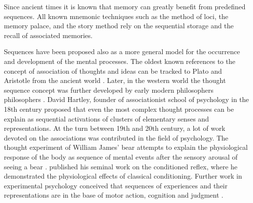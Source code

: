 
  Since ancient times it is known that memory can greatly benefit from
  predefined sequences. All known mnemonic techniques such as the method of
  loci, the memory palace, and the story method rely on the sequential storage
  and the recall of associated memories.

  Sequences have been proposed also as a more general model for the occurrence
  and development of the mental processes. The oldest known references to the
  concept of association of thoughts and ideas can be tracked to Plato and
  Aristotle from the ancient world \citep{Plato:Phaedo, Bloch2007}. Later, in the western world the thought
  sequence concept was further developed by early modern philosophers
  philosophers \citep{Hobbes, Locke, Hume, Hume2, Stewart}. David Hartley,
  founder of associationist school of psychology in the 18th century proposed
  that even the most complex thought processes can be explain as sequential
  activations of clusters of elementary senses and representations. At the turn
  between 19th and 20th century, a lot of work devoted on the associations was
  contributed in the field of psychology. The thought experiment of William
  James' bear attempts to explain the physiological response of the body as
  sequence of mental events after the sensory arousal of seeing a bear
  \citep{James1884}. \cite{Pavlov1897} published his seminal work on the
  conditioned reflex, where he demonstrated the physiological effects of
  classical conditioning. Further work in experimental psychology conceived
  that sequences of experiences and their representations are in the base of
  motor action, cognition and judgment \citep{Watt1904, Titchener1905,
  Washburn1916}.



